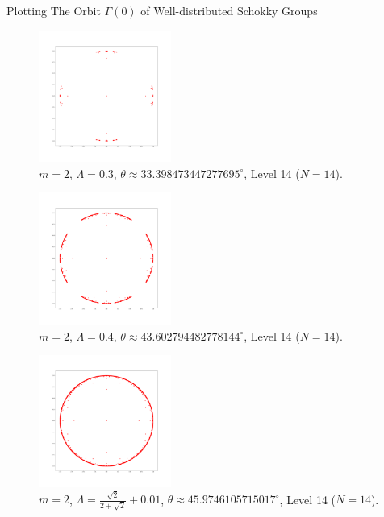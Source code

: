 \documentclass[final]{beamer}
\newlength{\onecolwid}
\begin{document}
\begin{frame}[t]
\begin{columns}[t]
\begin{column}{\onecolwid}
\begin{block}{Plotting The Orbit $\Gamma(0)$ of Well-distributed Schokky Groups}
\begin{multicols}{3}
\begin{figure}[H]
\centering
\includegraphics[width=0.386\textwidth]{Lambda=0.3,m=2,N=14.png}
\caption{$m=2$, $\Lambda=0.3$, $\theta\approx 33.398473447277695^{\circ}$, Level 14 ($N=14$).}
\end{figure}


\begin{figure}[H]
\centering
\includegraphics[width=0.386\textwidth]{Lambda=0.4,m=2,N=14.png}
\caption{$m=2$, $\Lambda=0.4$, $\theta\approx 43.602794482778144^{\circ}$, Level 14 ($N=14$).}
\end{figure}


\begin{figure}[H]
\centering
\includegraphics[width=0.386\textwidth]{Lambda=r+0.01,m=2,N=14.png}
\caption{{\scriptsize $m=2$, $\Lambda=\frac{\sqrt{2}}{2+\sqrt{2}}+0.01$, $\theta\approx 45.9746105715017^{\circ}$, Level 14 ($N=14$).}}
\end{figure}
\end{multicols}



\end{block}
\end{column}
\end{columns}
\end{frame}
\end{document}
